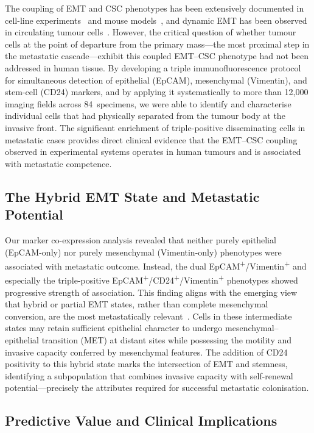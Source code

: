 \documentclass[11pt,a4paper]{article}
\begin{document}
The coupling of EMT and CSC phenotypes has been extensively documented in cell-line experiments~\cite{mani2008} and mouse models~\cite{shibue2017}, and dynamic EMT has been observed in circulating tumour cells~\cite{yu2013}. However, the critical question of whether tumour cells at the point of departure from the primary mass---the most proximal step in the metastatic cascade---exhibit this coupled EMT--CSC phenotype had not been addressed in human tissue. By developing a triple immunofluorescence protocol for simultaneous detection of epithelial (EpCAM), mesenchymal (Vimentin), and stem-cell (CD24) markers, and by applying it systematically to more than 12{,}000 imaging fields across 84~specimens, we were able to identify and characterise individual cells that had physically separated from the tumour body at the invasive front. The significant enrichment of triple-positive disseminating cells in metastatic cases provides direct clinical evidence that the EMT--CSC coupling observed in experimental systems operates in human tumours and is associated with metastatic competence.

\subsection{The Hybrid EMT State and Metastatic Potential}

Our marker co-expression analysis revealed that neither purely epithelial (EpCAM-only) nor purely mesenchymal (Vimentin-only) phenotypes were associated with metastatic outcome. Instead, the dual EpCAM\textsuperscript{+}/Vimentin\textsuperscript{+} and especially the triple-positive EpCAM\textsuperscript{+}/CD24\textsuperscript{+}/Vimentin\textsuperscript{+} phenotypes showed progressive strength of association. This finding aligns with the emerging view that hybrid or partial EMT states, rather than complete mesenchymal conversion, are the most metastatically relevant~\cite{pastushenko2019,jolly2015,grosse-wilde2015}. Cells in these intermediate states may retain sufficient epithelial character to undergo mesenchymal--epithelial transition (MET) at distant sites while possessing the motility and invasive capacity conferred by mesenchymal features. The addition of CD24 positivity to this hybrid state marks the intersection of EMT and stemness, identifying a subpopulation that combines invasive capacity with self-renewal potential---precisely the attributes required for successful metastatic colonisation.

\subsection{Predictive Value and Clinical Implications}
\end{document}

